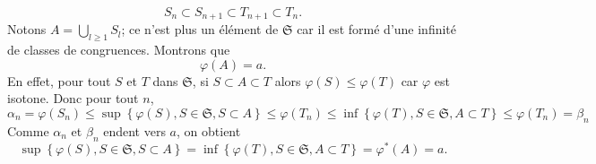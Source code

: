\begin{demo}
\begin{displaymath}
 S_n \subset S_{n+1} \subset T_{n+1} \subset T_n.
\end{displaymath}
Notons $A = \bigcup_{l\geq 1}S_l$; ce n'est plus un élément de $\mathfrak{S}$ car il est formé d'une infinité de classes de congruences. Montrons que
\begin{displaymath}
 \varphi(A) = a.
\end{displaymath}
En effet, pour tout $S$ et $T$ dans $\mathfrak{S}$,  si $S \subset A \subset T$ alors $\varphi(S) \leq \varphi(T)$ car $\varphi$ est isotone. Donc pour tout $n$,
\begin{displaymath}
 \alpha_n = \varphi(S_n) \leq \sup \left\lbrace \varphi(S), S \in \mathfrak{S}, S \subset A\right\rbrace
 \leq \varphi(T_n) \leq \inf \left\lbrace \varphi(T), S \in \mathfrak{S}, A \subset T\right\rbrace
 \leq \varphi(T_n) = \beta_n
\end{displaymath}
Comme $\alpha_n$ et $\beta_n$ endent vers $a$, on obtient
\begin{displaymath}
 \sup \left\lbrace \varphi(S), S \in \mathfrak{S}, S \subset A\right\rbrace
 =
 \inf \left\lbrace \varphi(T), S \in \mathfrak{S}, A \subset T\right\rbrace
 =
 \varphi^*(A) = a .
\end{displaymath}
\end{demo}


